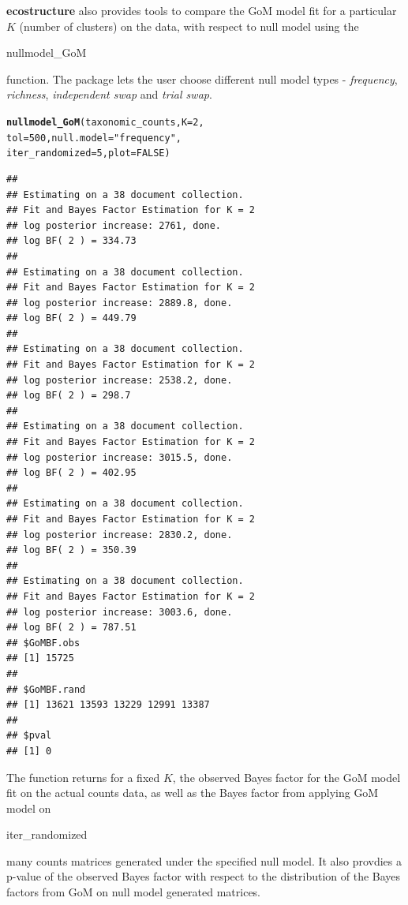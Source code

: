 \documentclass[12pt]{article}\usepackage[]{graphicx}\usepackage[usenames,dvipsnames]{color}
\makeatletter
\newcommand{\hlnum}[1]{\textcolor[rgb]{0.686,0.059,0.569}{#1}}%
\newcommand{\hlstr}[1]{\textcolor[rgb]{0.192,0.494,0.8}{#1}}%
\newcommand{\hlstd}[1]{\textcolor[rgb]{0.345,0.345,0.345}{#1}}%
\newcommand{\hlkwc}[1]{\textcolor[rgb]{0.333,0.667,0.333}{#1}}%
\newcommand{\hlkwd}[1]{\textcolor[rgb]{0.737,0.353,0.396}{\textbf{#1}}}%
\newenvironment{kframe}{%
 \def\at@end@of@kframe{}%
 \ifinner\ifhmode%
  \def\at@end@of@kframe{\end{minipage}}%
  \begin{minipage}{\columnwidth}%
 \fi\fi%
 \def\FrameCommand##1{\hskip\@totalleftmargin \hskip-\fboxsep
 \colorbox{shadecolor}{##1}\hskip-\fboxsep
     \hskip-\linewidth \hskip-\@totalleftmargin \hskip\columnwidth}%
 \MakeFramed {\advance\hsize-\width
   \@totalleftmargin\z@ \linewidth\hsize
   \@setminipage}}%
 {\par\unskip\endMakeFramed%
 \at@end@of@kframe}
\newenvironment{knitrout}{}{} %
\makeatother
\begin{document}
\newpage

\textbf{ecostructure} also provides tools to compare the GoM model fit for a particular $K$ (number of clusters) on the data, with respect to null model using the \begin{verb} nullmodel_GoM \end{verb} function. The package lets the user choose different null model types - \textit{frequency}, \textit{richness}, \textit{independent swap} and \textit{trial swap}.

\begin{knitrout}
\color{fgcolor}\begin{kframe}
\begin{alltt}
\hlkwd{nullmodel_GoM}\hlstd{(taxonomic_counts,} \hlkwc{K}\hlstd{=}\hlnum{2}\hlstd{,}
               \hlkwc{tol}\hlstd{=}\hlnum{500}\hlstd{,} \hlkwc{null.model}\hlstd{=}\hlstr{"frequency"}\hlstd{,}
               \hlkwc{iter_randomized}\hlstd{=}\hlnum{5}\hlstd{,} \hlkwc{plot}\hlstd{=}\hlnum{FALSE}\hlstd{)}
\end{alltt}
\begin{verbatim}
## 
## Estimating on a 38 document collection.
## Fit and Bayes Factor Estimation for K = 2
## log posterior increase: 2761, done.
## log BF( 2 ) = 334.73
## 
## Estimating on a 38 document collection.
## Fit and Bayes Factor Estimation for K = 2
## log posterior increase: 2889.8, done.
## log BF( 2 ) = 449.79
## 
## Estimating on a 38 document collection.
## Fit and Bayes Factor Estimation for K = 2
## log posterior increase: 2538.2, done.
## log BF( 2 ) = 298.7
## 
## Estimating on a 38 document collection.
## Fit and Bayes Factor Estimation for K = 2
## log posterior increase: 3015.5, done.
## log BF( 2 ) = 402.95
## 
## Estimating on a 38 document collection.
## Fit and Bayes Factor Estimation for K = 2
## log posterior increase: 2830.2, done.
## log BF( 2 ) = 350.39
## 
## Estimating on a 38 document collection.
## Fit and Bayes Factor Estimation for K = 2
## log posterior increase: 3003.6, done.
## log BF( 2 ) = 787.51
## $GoMBF.obs
## [1] 15725
## 
## $GoMBF.rand
## [1] 13621 13593 13229 12991 13387
## 
## $pval
## [1] 0
\end{verbatim}
\end{kframe}
\end{knitrout}

The function returns for a fixed $K$, the observed Bayes factor for the GoM model fit on the actual counts data, as well as the Bayes factor from applying GoM model on \begin{verb} iter_randomized \end{verb} many counts matrices generated under the specified null model. It also provdies a p-value of the observed Bayes factor with respect to the distribution of the Bayes factors from GoM on null model generated matrices.
\end{document}

